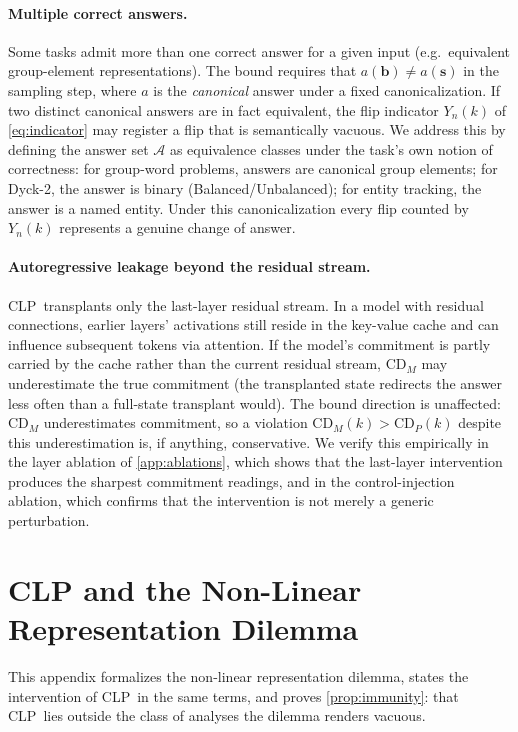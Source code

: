 \documentclass[11pt]{article}
\newcommand{\CDP}{\mathrm{CD}_{P}}
\newcommand{\CDM}{\mathrm{CD}_{M}}
\newcommand{\stepk}{k}
\newcommand{\CLP}{\textsc{CLP}}
\begin{document}
\paragraph{Multiple correct answers.}
Some tasks admit more than one correct answer for a given input (e.g.\
equivalent group-element representations). The bound requires that
$a(\mathbf{b})\neq a(\mathbf{s})$ in the sampling step, where $a$ is the
\emph{canonical} answer under a fixed canonicalization. If two distinct
canonical answers are in fact equivalent, the flip indicator $Y_n(\stepk)$ of
\cref{eq:indicator} may register a flip that is semantically vacuous. We
address this by defining the answer set $\mathcal{A}$ as equivalence classes
under the task's own notion of correctness: for group-word problems, answers are
canonical group elements; for Dyck-2, the answer is binary
(Balanced/Unbalanced); for entity tracking, the answer is a named entity. Under
this canonicalization every flip counted by $Y_n(\stepk)$ represents a genuine
change of answer.

\paragraph{Autoregressive leakage beyond the residual stream.}
\CLP\ transplants only the last-layer residual stream. In a model with residual
connections, earlier layers' activations still reside in the key-value cache and
can influence subsequent tokens via attention. If the model's commitment is
partly carried by the cache rather than the current residual stream, $\CDM$ may
underestimate the true commitment (the transplanted state redirects the answer
less often than a full-state transplant would). The bound direction is
unaffected: $\CDM$ underestimates commitment, so a violation $\CDM(\stepk) >
\CDP(\stepk)$ despite this underestimation is, if anything, conservative. We
verify this empirically in the layer ablation of \cref{app:ablations}, which
shows that the last-layer intervention produces the sharpest commitment
readings, and in the control-injection ablation, which confirms that the
intervention is not merely a generic perturbation.

\section{CLP and the Non-Linear Representation Dilemma}
\label{app:dilemma}

This appendix formalizes the non-linear representation dilemma, states the
intervention of \CLP\ in the same terms, and proves \cref{prop:immunity}: that
\CLP\ lies outside the class of analyses the dilemma renders vacuous.
\end{document}
